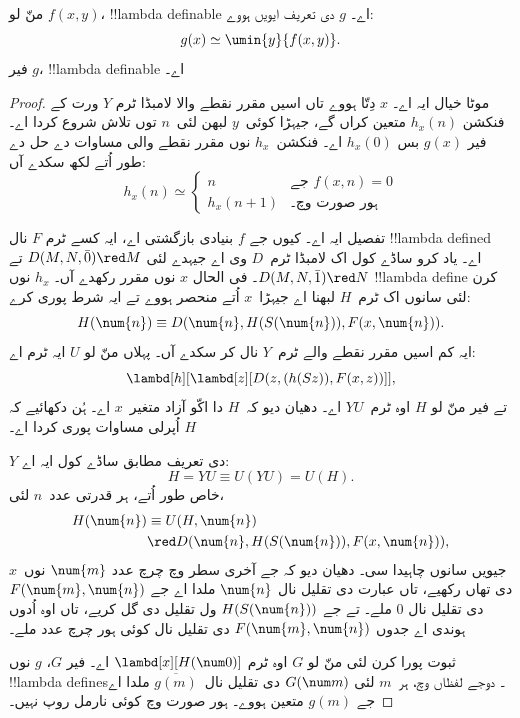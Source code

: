 \documentclass[../../../include/open-logic-section]{subfiles}
\begin{document}

\begin{lem}
منّ لو $f(x,y)$، !!{lambda definable} اے۔ $g$ دی تعریف ایویں ہووے:
\[
g(x) \simeq \umin{y}{f(x,y)}.
\]
فیر $g$، !!{lambda definable} اے۔
\end{lem}

\begin{proof}
موٹا خیال ایہ اے۔ $x$ دِتّا ہووے تاں اسیں مقرر نقطے والا لامبڈا
ٹرم $Y$ ورت کے فنکشن $h_x(n)$ متعین کراں گے، جیہڑا کوئی~$y$
لبھن لئی~$n$ توں تلاش شروع کردا اے۔ فیر $g(x)$ بس $h_x(0)$ اے۔
فنکشن~$h_x$ نوں مقرر نقطے والی مساوات دے حل دے طور اُتے لکھ سکدے آں:
\[
h_x(n) \simeq
\begin{cases}
n & \text{جے $f(x,n) = 0$} \\
h_x(n+1) & \text{ہور صورت وچ۔}
\end{cases}
\]

تفصیل ایہ اے۔ کیوں جے $f$ بنیادی بازگشتی اے، ایہ کسے ٹرم $F$
نال !!{lambda defined} اے۔ یاد کرو ساڈے کول اک لامبڈا ٹرم~$D$
وی اے جیہدے لئی $D(M, N, \bar{0}) \red M$ تے $D(M, N, \bar{1})
\red N$۔ فی الحال $x$ نوں مقرر رکھدے آں۔ $h_x$ نوں !!{lambda define}
کرن لئی سانوں اک ٹرم~$H$ لبھنا اے جیہڑا~$x$ اُتے منحصر ہووے
تے ایہ شرط پوری کرے:
\[
H(\num{n}) \equiv D(\num{n}, H(S(\num{n})), F(x, \num{n})).
\]
ایہ کم اسیں مقرر نقطے والے ٹرم~$Y$ نال کر سکدے آں۔ پہلاں منّ لو
$U$ ایہ ٹرم اے:
\[
\lambd[h][\lambd[z][D(z,(h(Sz)),F(x,z))]],
\]
تے فیر منّ لو $H$ اوہ ٹرم~$YU$ اے۔ دھیان دیو کہ~$H$ دا اکّو
آزاد متغیر~$x$ اے۔ ہُن دکھائیے کہ $H$ اُپرلی مساوات پوری کردا اے۔

$Y$ دی تعریف مطابق ساڈے کول ایہ اے:
\[
H = YU \equiv U(YU) = U(H).
\]
خاص طور اُتے، ہر قدرتی عدد~$n$ لئی،
\begin{align*}
H(\num{n}) & \equiv U(H, \num{n}) \\
& \red D(\num{n}, H(S(\num{n})), F(x, \num{n})),
\end{align*}
جیویں سانوں چاہیدا سی۔ دھیان دیو کہ جے آخری سطر وچ چرچ عدد
$\num{m}$ نوں~$x$ دی تھاں رکھیے، تاں عبارت دی تقلیل نال
$\num{n}$ ملدا اے جے $F(\num{m},
\num{n})$ دی تقلیل نال $\num{0}$ ملے۔ تے جے
$H(S(\num{n}))$ ول تقلیل دی گل کریے، تاں اوہ اُدوں ہوندی اے جدوں
$F(\num{m}, \num{n})$ دی تقلیل نال کوئی ہور چرچ عدد ملے۔

ثبوت پورا کرن لئی منّ لو $G$ اوہ ٹرم $\lambd[x][H(\num 0)]$
اے۔ فیر $G$، $g$ نوں !!{lambda define}s۔ دوجے لفظاں وچ، ہر~$m$
لئی $G(\num m)$ دی تقلیل نال~$\overline {g(m)}$ ملدا اے جے
$g(m)$ متعین ہووے۔ ہور صورت وچ کوئی نارمل روپ نہیں۔
\end{proof}
\end{document}
